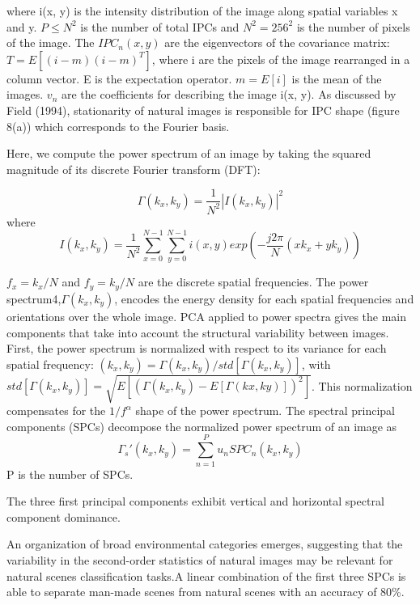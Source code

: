 \documentclass{article}
\begin{document}
where i(x, y) is the intensity distribution of the image along spatial variables x and y. $P \leq N^2$
is the number of total IPCs and $N^2 = 256^2$ is the number of pixels of the image. The $IPC_n(x, y)$ are the eigenvectors of the covariance matrix: $T = E[(i-m)(i-m)^T]$, where i are the pixels
of the image rearranged in a column vector. E is the expectation operator. $m = E[i]$ is the mean of the images. $v_n$ are the coefficients for describing the image i(x, y). As discussed by Field (1994),
stationarity of natural images is responsible for IPC shape (figure 8(a)) which corresponds to the Fourier basis.

Here, we compute the power spectrum of an image by taking the squared magnitude of its discrete Fourier transform (DFT):

\begin{equation}
    \Gamma(k_x,k_y) = \frac{1}{N^2}|I(k_x,k_y)|^2
\end{equation}
where
\begin{equation}
    I(k_x,k_y) = \frac{1}{N^2}\sum^{N-1}_{x=0}\sum^{N-1}_{y=0}i(x,y)exp(-\frac{j2\pi}{N}(xk_x+yk_y))
\end{equation}

$f_x = k_x/N$ and $f_y = k_y/N$ are the discrete spatial frequencies. The power spectrum4,$\Gamma(k_x, k_y)$, encodes the energy density for each spatial frequencies and orientations over the
whole image. PCA applied to power spectra gives the main components that take into account the structural variability between images. First, the power spectrum is normalized with respect
to its variance for each spatial frequency: $(k_x, k_y) = \Gamma(k_x, k_y)/std[\Gamma(k_x, k_y)]$, with
$std[\Gamma(k_x, k_y)] = \sqrt{E[(\Gamma(k_x, k_y) - E[\Gamma(kx, ky)])^2]}$. This normalization compensates for the
$1/f^{\alpha}$ shape of the power spectrum. The spectral principal components (SPCs) decompose the
normalized power spectrum of an image as
\begin{equation}
    \Gamma_s'(k_x,k_y) = \sum^P_{n=1}u_n SPC_n(k_x,k_y)
\end{equation}
P is the number of SPCs.

The three first principal components exhibit vertical and horizontal spectral component dominance. 

 An organization of broad environmental categories emerges, suggesting that the variability in the second-order statistics of natural images may be relevant for natural scenes classification tasks.A linear combination of the first three SPCs is able to separate man-made scenes from natural
scenes with an accuracy of 80\%.
\end{document}
